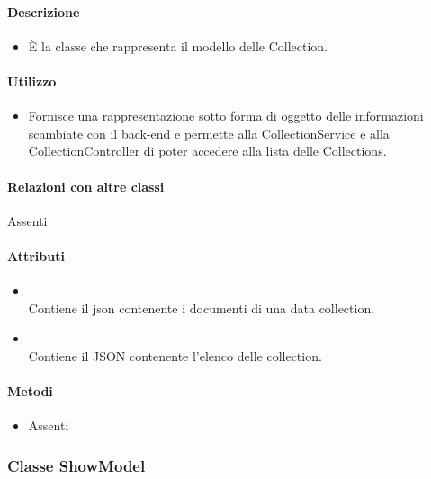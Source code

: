 \paragraph*{Descrizione}
\begin{itemize}
\item[] È la classe che rappresenta il modello delle Collection.
\end{itemize}

\paragraph*{Utilizzo}
\begin{itemize}
\item[] Fornisce una rappresentazione sotto forma di oggetto delle informazioni scambiate con il back-end e permette alla CollectionService e alla CollectionController di poter accedere alla lista delle Collections.
\end{itemize}

\paragraph*{Relazioni con altre classi}
Assenti

\paragraph*{Attributi}
\begin{itemize}
\item[]  \\ Contiene il json contenente i documenti di una data collection.
\item[]  \\ Contiene il JSON contenente l'elenco delle collection.
\end{itemize}

\paragraph*{Metodi}
\begin{itemize}
\item[] Assenti
\end{itemize}

\subsubsection{Classe ShowModel}

